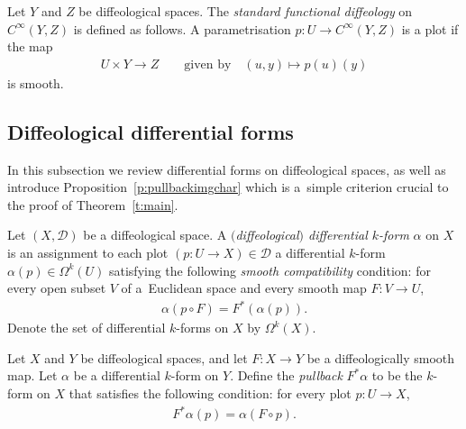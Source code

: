 \documentclass[11pt]{article}
\numberwithin{equation}{section}
\newcommand{\CIN}{{C^\infty}} %
\begin{document}
\begin{Definition}
\label{d:functional}
Let $Y$ and $Z$ be dif\/feological spaces.
The \emph{standard functional diffeology} on $\CIN(Y,Z)$ is def\/ined as follows.
A parametrisation $p \colon U \to \CIN(Y,Z)$ is a plot if the map
 \begin{gather*} U \times Y\to Z \qquad \text{given by} \quad (u,y)\mapsto p(u)(y) \end{gather*}
is smooth.
\end{Definition}

\subsection*{Dif\/feological dif\/ferential forms}

In this subsection we review dif\/ferential forms on dif\/feological spaces, as well as introduce Proposition~\ref{p:pullbackimgchar} which is a~simple criterion crucial to the proof of Theorem~\ref{t:main}.

\begin{Definition}
\label{d:diff forms}
Let $(X,\mathcal{D})$ be a dif\/feological space.
A \emph{$($diffeological$)$ differential $k$-form} $\alpha$ on $X$
is an assignment to each plot $( p \colon U \to X) \in \mathcal{D}$
a dif\/ferential $k$-form $\alpha(p) \in \Omega^k(U)$
satisfying the following \emph{smooth compatibility} condition:
for every open subset $V$ of a~Euclidean space
and every smooth map $F \colon V \to U$,
\begin{gather*} \alpha(p\circ F) = F^* (\alpha(p)) .\end{gather*}
Denote the set of dif\/ferential $k$-forms on $X$ by $\Omega^k(X)$.
\end{Definition}

\begin{Definition}
\label{d:pullback}
Let $X$ and $Y$ be dif\/feological spaces, and let $F \colon X\to Y$
be a dif\/feologically smooth map.
Let $\alpha$ be a dif\/ferential $k$-form on $Y$.
Def\/ine the \emph{pullback} $F^*\alpha$ to be the $k$-form on $X$
that satisf\/ies the following condition:
for every plot $p \colon U \to X$,
\begin{gather*} F^* \alpha(p) = \alpha(F\circ p) .\end{gather*}
\end{Definition}
\end{document}
